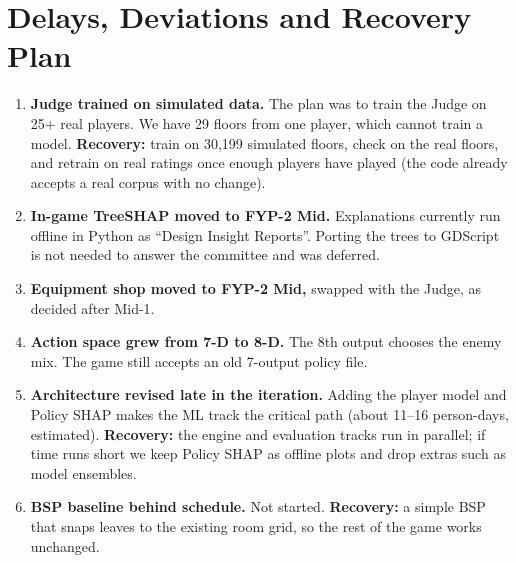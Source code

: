 \section{Delays, Deviations and Recovery Plan}
\begin{enumerate}
    \item \textbf{Judge trained on simulated data.} The plan was to train the Judge on 25+ real players. We have 29 floors from one player, which cannot train a model. \textbf{Recovery:} train on 30,199 simulated floors, check on the real floors, and retrain on real ratings once enough players have played (the code already accepts a real corpus with no change).
    \item \textbf{In-game TreeSHAP moved to FYP-2 Mid.} Explanations currently run offline in Python as ``Design Insight Reports''. Porting the trees to GDScript is not needed to answer the committee and was deferred.
    \item \textbf{Equipment shop moved to FYP-2 Mid,} swapped with the Judge, as decided after Mid-1.
    \item \textbf{Action space grew from 7-D to 8-D.} The 8th output chooses the enemy mix. The game still accepts an old 7-output policy file.
    \item \textbf{Architecture revised late in the iteration.} Adding the player model and Policy SHAP makes the ML track the critical path (about 11--16 person-days, estimated). \textbf{Recovery:} the engine and evaluation tracks run in parallel; if time runs short we keep Policy SHAP as offline plots and drop extras such as model ensembles.
    \item \textbf{BSP baseline behind schedule.} Not started. \textbf{Recovery:} a simple BSP that snaps leaves to the existing room grid, so the rest of the game works unchanged.
\end{enumerate}
